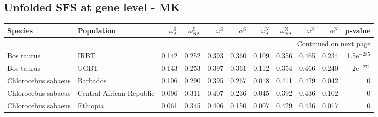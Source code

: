 \subsection{Unfolded SFS at gene level - MK} 
\begin{longtable}{llrrrrrrrrr}
\toprule
             Species &                Population & $\omega_{\textrm{A}}^{\textrm{S}}$ & $\omega_{\textrm{NA}}^{\textrm{S}}$ & $\omega^{\textrm{S}}$ & $\alpha^{\textrm{S}}$ & $\omega_{\textrm{A}}^{\textrm{N}}$ & $\omega_{\textrm{NA}}^{\textrm{N}}$ & $\omega^{\textrm{N}}$ & $\alpha^{\textrm{N}}$ &       p-value \\
\midrule
\endhead
\midrule
\multicolumn{11}{r}{{Continued on next page}} \\
\midrule
\endfoot

\bottomrule
\endlastfoot
          Bos taurus &                      IRBT &                              0.142 &                               0.252 &                 0.393 &                 0.360 &                              0.109 &                               0.356 &                 0.465 &                 0.234 & 1.5e$^{-285}$ \\
          Bos taurus &                      UGBT &                              0.143 &                               0.253 &                 0.397 &                 0.361 &                              0.112 &                               0.354 &                 0.466 &                 0.240 &   2e$^{-271}$ \\
 Chlorocebus sabaeus &                  Barbados &                              0.106 &                               0.290 &                 0.395 &                 0.267 &                              0.018 &                               0.411 &                 0.429 &                 0.042 &             0 \\
 Chlorocebus sabaeus &  Central African Republic &                              0.096 &                               0.311 &                 0.407 &                 0.236 &                              0.045 &                               0.392 &                 0.436 &                 0.102 &             0 \\
 Chlorocebus sabaeus &                  Ethiopia &                              0.061 &                               0.345 &                 0.406 &                 0.150 &                              0.007 &                               0.429 &                 0.436 &                 0.017 &             0 \\

\end{longtable}
